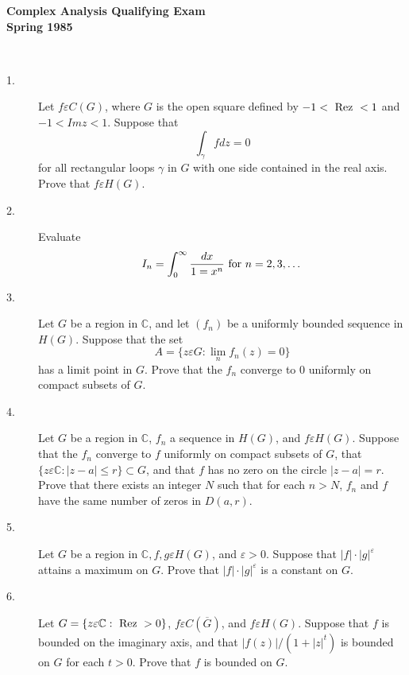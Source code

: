 \documentclass{article}
\def\C{\mathbb C}
\begin{document}






\begin{center}\begin{LARGE}
{\bf Complex Analysis Qualifying Exam}\\ 
{\bf Spring 1985}\\ \end{LARGE}
\end{center}
\vspace{0.1in}
\noindent\hrulefill\\

\begin{description}
\item[1.]
Let $f \varepsilon C(G)$, where $G$ is the open square defined by
$-1 < \hbox{\ Rez\ } < 1$ and $-1 < Imz < 1$. Suppose that
$$\int_\gamma fdz = 0$$
for all rectangular loops $\gamma$ in $G$ with one side contained in the
real axis. Prove that $f \varepsilon H(G)$.

\item[2.]
Evaluate
$$I_n = \int^\infty_0 \frac{dx}{1 = x^n} \hbox{\ for\ } n=2,3, \dots$$

\item[3.]
Let $G$ be a region in $\C$, and let $(f_n)$ be a uniformly bounded
sequence in $H(G)$. Suppose that the set
$$A = \{z \varepsilon G : \lim_n f_n (z) = 0\}$$
has a limit point in $G$. Prove that the $f_n$ converge to 0 uniformly
on compact subsets of $G$.

\item[4.]
Let $G$ be a region in $\C$, $f_n$ a sequence in $H(G)$, and
$f \varepsilon H(G)$. Suppose that the $f_n$ converge to $f$ uniformly
on compact subsets of $G$, that
$\{z \varepsilon \C : |z-a| \leq r\} \subset G$, and that $f$ has no
zero on the circle $|z-a| = r$. Prove that there exists an integer $N$ such
that for each $n > N$, $f_n$ and $f$ have the same number of zeros in
$D(a,r)$.

\item[5.]
Let $G$ be a region in $\C, f, g \varepsilon H(G)$, and $\varepsilon > 0$.
Suppose that $|f| \cdot |g|^\varepsilon$ attains a maximum on $G$. Prove
that $|f| \cdot |g|^\varepsilon$ is a constant on $G$.

\item[6.]
Let $G = \{z \varepsilon \C : \hbox{\ Rez\ } >0\}$,
$f \varepsilon C(\overline G)$, and $f \varepsilon H(G)$. Suppose that $f$
is bounded on the imaginary axis, and that
$|f(z)| / (1+|z|^t)$ is bounded on $G$ for each $t >0$. Prove that $f$ is
bounded on $G$.


\end{description}
\end{document}
